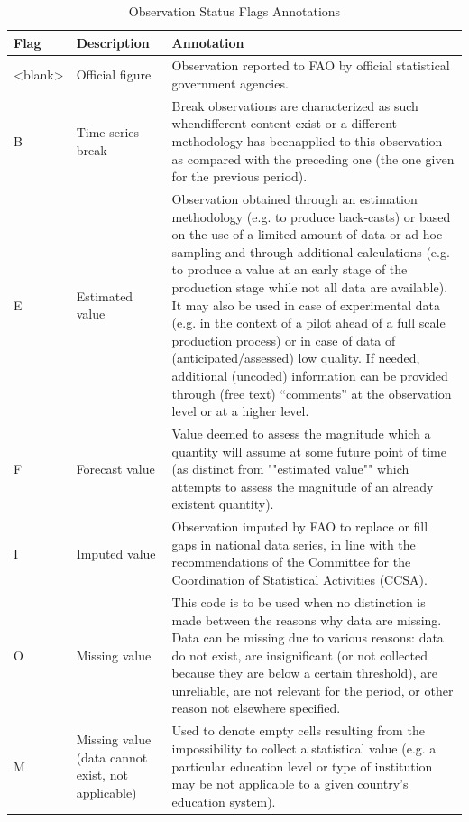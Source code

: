 \documentclass[
]{book}
\begin{document}
\begin{table}

\caption{\label{tab:tabFlagObservationStatus}Observation Status Flags Annotations}
\centering
\fontsize{14}{16}\selectfont
\begin{tabular}[t]{l|l|l}
\hline
\rowcolor[HTML]{a9c9a7}  Flag & Description & Annotation\\
\hline
<blank> & Official figure & Observation reported to FAO by official statistical government agencies.\\
\hline
B & Time series break & Break observations are characterized as such whendifferent content exist or a different methodology has beenapplied to this observation as compared with the preceding one (the one given for the previous period).\\
\hline
E & Estimated value & Observation obtained through an estimation methodology (e.g. to produce back-casts) or based on the use of a limited amount of data or ad hoc sampling and through additional calculations (e.g. to produce a value at an early stage of the production stage while not all data are available). It may also be used in case of experimental data (e.g. in the context of a pilot ahead of a full scale production process) or in case of data of (anticipated/assessed) low quality. If needed, additional (uncoded) information can be provided through (free text) “comments” at the observation level or at a higher level.\\
\hline
F & Forecast value & Value deemed to assess the magnitude which a quantity will assume at some future point of time (as distinct from ""estimated value"" which attempts to assess the magnitude of an already existent quantity).\\
\hline
I & Imputed value & Observation imputed by FAO to replace or fill gaps in national data series, in line with the recommendations of the Committee for the Coordination of Statistical Activities (CCSA).\\
\hline
O & Missing value & This code is to be used when no distinction is made between the reasons why data are missing. Data can be missing due to various reasons: data do not exist, are insignificant (or not collected because they are below a certain threshold), are unreliable, are not relevant for the period, or other reason not elsewhere specified.\\
\hline
M & Missing value (data cannot exist, not applicable) & Used to denote empty cells resulting from the impossibility to collect a statistical value (e.g. a particular education level or type of institution may be not applicable to a given country's education system).\\

\end{tabular}
\end{table}
\end{document}
